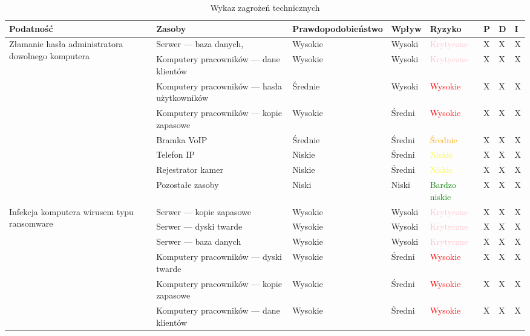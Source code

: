 \begin{landscape}
	\begin{longtable}[ht!]{|m{3cm}|m{6cm}|m{4.5cm}|m{3cm}|m{3cm}|m{0.5cm}|m{0.5cm}|m{0.5cm}|}
		\caption{Wykaz zagrożeń technicznych}
		\label{tab:zagrozenia_techniczne2}\\
		\hline	
		\textbf{Podatność} & \textbf{Zasoby} & \textbf{Prawdopodobieństwo} & \textbf{Wpływ} &  \textbf{Ryzyko} & \textbf{P} & \textbf{D} & \textbf{I} \\ \hline
		\multirow{5}{4cm}{Złamanie hasła administratora dowolnego komputera}  
		&   Serwer --- baza danych,  & Wysokie & Wysoki & \textcolor{pink}{Krytyczne} & X & X & X  \\ \cline{2-8}
		& Komputery pracowników --- dane klientów & Wysokie & Wysoki & \textcolor{pink}{Krytyczne}  & X & X & X  \\ \cline{2-8}
		& Komputery pracowników --- hasła użytkowników & Średnie & Wysoki & \textcolor{red}{Wysokie}  & X & X & X  \\ \cline{2-8}
		& Komputery pracowników --- kopie zapasowe & Wysokie & Średni & \textcolor{red}{Wysokie}  & X & X & X  \\ \cline{2-8}
		& Bramka VoIP & Średnie & Średni & \textcolor{orange}{Średnie}  & X & X & X  \\ \cline{2-8}
		& Telefon IP & Niskie & Średni & \textcolor{yellow}{Niskie}  & X & X & X  \\ \cline{2-8}
		& Rejestrator kamer & Niskie & Średni & \textcolor{yellow}{Niskie}  & X & X & X  \\ \cline{2-8}
		& Pozostałe zasoby & Niski & Niski & \textcolor{green}{Bardzo niskie} & X & X & X  \\ \cline{2-8}
		\hline
		\multirow{8}{4cm}{Infekcja komputera wirusem typu ransomware}
		& Serwer --- kopie zapasowe & Wysokie & Wysoki & \textcolor{pink}{Krytyczne}& X & X & X  \\ \cline{2-8} \cline{2-5}
		& Serwer --- dyski twarde & Wysokie & Wysoki & \textcolor{pink}{Krytyczne} & X & X & X  \\ \cline{2-8}
		& Serwer --- baza danych & Wysokie & Wysoki & \textcolor{pink}{Krytyczne} & X & X & X  \\ \cline{2-8}
		& Komputery pracowników --- dyski twarde & Wysokie & Średni & \textcolor{red}{Wysokie} & X & X & X  \\ \cline{2-8}
		& Komputery pracowników --- kopie zapasowe & Wysokie & Średni & \textcolor{red}{Wysokie} & X & X & X  \\ \cline{2-8}
		& Komputery pracowników --- dane klientów & Wysokie & Średni & \textcolor{red}{Wysokie} & X & X & X  \\ \cline{2-8}

\end{longtable}
\end{landscape}
